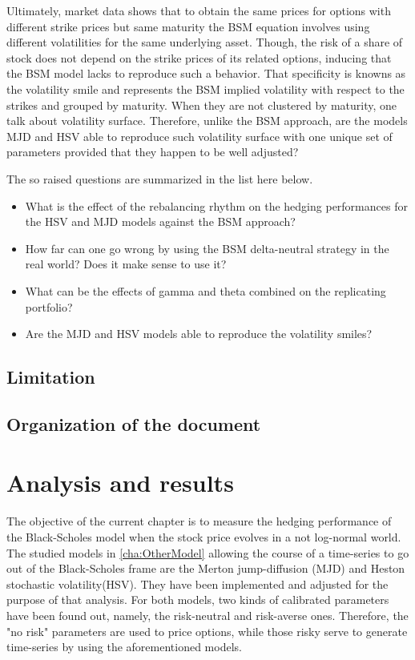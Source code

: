 \documentclass[12pt]{report}
\begin{document}
Ultimately, market data shows that to obtain the same prices for options with different strike prices but same maturity the BSM equation involves using different volatilities for the same underlying asset.
Though, the risk of a share of stock does not depend on the strike prices of its related options, inducing that the BSM model lacks to reproduce such a behavior.
That specificity is knowns as the volatility smile and represents the BSM implied volatility with respect to the strikes and grouped by maturity.
When they are not clustered by maturity, one talk about volatility surface.
Therefore, unlike the BSM approach, are the models MJD and HSV able to reproduce such volatility surface with one unique set of parameters provided that they happen to be well adjusted?

The so raised questions are summarized in the list here below.

\begin{itemize}
\item What is the effect of the rebalancing rhythm on the hedging performances for the HSV and MJD models against the BSM approach? 
\item How far can one go wrong by using the BSM delta-neutral strategy in the real world? Does it make sense to use it?
\item What can be the effects of gamma and theta combined on the replicating portfolio?
\item Are the MJD and HSV models able to reproduce the volatility smiles? 
\end{itemize}

\section{Limitation}
\label{sec:timitation}


\section{Organization of the document}
\label{sec:introduction:organization}
\chapter{Analysis and results}
\label{cha:analysis}

The objective of the current chapter is to measure the hedging performance of the Black-Scholes model when the stock price evolves in a not log-normal world.
The studied models in \cref{cha:OtherModel} allowing the course of a time-series to go out of the Black-Scholes frame are the Merton jump-diffusion (MJD) and Heston stochastic volatility(HSV).
They have been implemented and adjusted for the purpose of that analysis. 
For both models, two kinds of calibrated parameters have been found out, namely, the risk-neutral and risk-averse ones. 
Therefore, the "no risk" parameters are used to price options, while those risky serve to generate time-series by using the aforementioned models.
\end{document}
